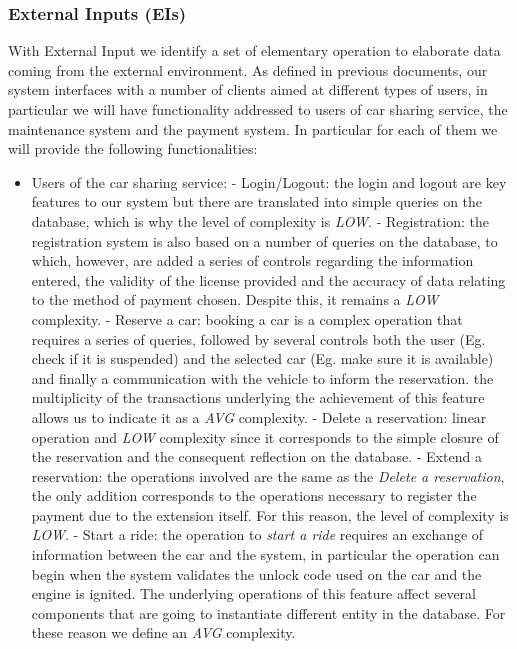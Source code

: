 \documentclass[10pt, a4paper,titlepage]{article}
\begin{document}
\subsubsection{External Inputs (EIs)}
With External Input we identify a set of elementary operation to elaborate data coming from
the external environment.
As defined in previous documents, our system interfaces with a number of clients aimed at different types of users, in particular we will have functionality addressed to users of car sharing service, the maintenance system and the payment system.
In particular for each of them we will provide the following functionalities:
\begin{itemize}
\item Users of the car sharing service:
\subitem - Login/Logout: the login and logout are key features to our system but there are translated into simple queries on the database, which is why the level of complexity is \emph{LOW}.
\subitem - Registration: the registration system is also based on a number of queries on the database, to which, however, are added a series of controls regarding the information entered, the validity of the license provided and the accuracy of data relating to the method of payment chosen. Despite this, it remains a \emph{LOW} complexity.
\subitem - Reserve a car: booking a car is a complex operation that requires a series of queries, followed by several controls both the user (Eg. check if it is suspended) and the selected car (Eg. make sure it is available) and finally a communication with the vehicle to inform the reservation. the multiplicity of the transactions underlying the achievement of this feature allows us to indicate it as a \emph{AVG} complexity.
\subitem - Delete a reservation: linear operation and \emph{LOW} complexity since it corresponds to the simple closure of the reservation and the consequent reflection on the database.
\subitem - Extend a reservation: the operations involved are the same as the \emph{Delete a reservation}, the only addition corresponds to the operations necessary to register the payment due to the extension itself. For this reason, the level of complexity is \emph{LOW}.
\subitem - Start a ride: the operation to \emph{start a ride} requires an exchange of information between the car and the system, in particular the operation can begin when the system validates the unlock code used on the car and the engine is ignited. The underlying operations of this feature affect several components that are going to instantiate different entity in the database. For these reason we define an \emph{AVG} complexity.

\end{itemize}
\end{document}
